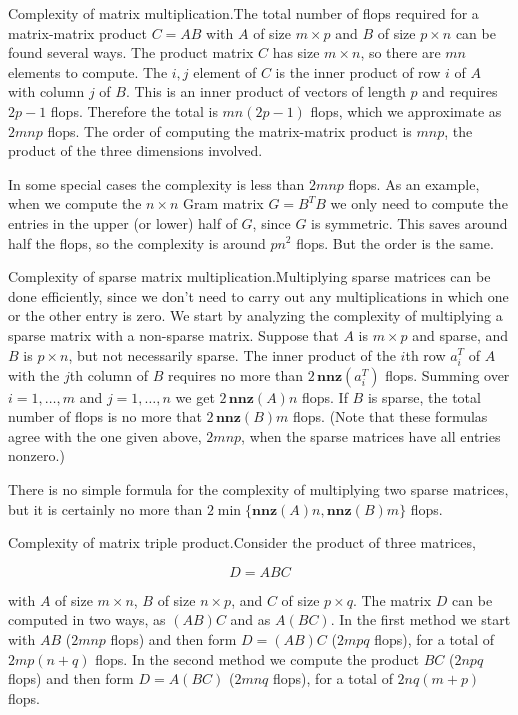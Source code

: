 
Complexity of matrix multiplication.The total number of flops required for a matrix-matrix product \(C=AB\) with \(A\) of size \(m\times p\) and \(B\) of size \(p\times n\) can be found several ways. The product matrix \(C\) has size \(m\times n\), so there are \(mn\) elements to compute. The \(i,j\) element of \(C\) is the inner product of row \(i\) of \(A\) with column \(j\) of \(B\). This is an inner product of vectors of length \(p\) and requires \(2p-1\) flops. Therefore the total is \(mn(2p-1)\) flops, which we approximate as \(2mnp\) flops. The order of computing the matrix-matrix product is \(mnp\), the product of the three dimensions involved.

In some special cases the complexity is less than \(2mnp\) flops. As an example, when we compute the \(n\times n\) Gram matrix \(G=B^{T}B\) we only need to compute the entries in the upper (or lower) half of \(G\), since \(G\) is symmetric. This saves around half the flops, so the complexity is around \(pn^{2}\) flops. But the order is the same.

Complexity of sparse matrix multiplication.Multiplying sparse matrices can be done efficiently, since we don't need to carry out any multiplications in which one or the other entry is zero. We start by analyzing the complexity of multiplying a sparse matrix with a non-sparse matrix. Suppose that \(A\) is \(m\times p\) and sparse, and \(B\) is \(p\times n\), but not necessarily sparse. The inner product of the \(i\)th row \(a_{i}^{T}\) of \(A\) with the \(j\)th column of \(B\) requires no more than \(2\,\mathbf{nnz}(a_{i}^{T})\) flops. Summing over \(i=1,\ldots,m\) and \(j=1,\ldots,n\) we get \(2\,\mathbf{nnz}(A)n\) flops. If \(B\) is sparse, the total number of flops is no more that \(2\,\mathbf{nnz}(B)m\) flops. (Note that these formulas agree with the one given above, \(2mnp\), when the sparse matrices have all entries nonzero.)

There is no simple formula for the complexity of multiplying two sparse matrices, but it is certainly no more than \(2\min\{\mathbf{nnz}(A)n,\mathbf{nnz}(B)m\}\) flops.

Complexity of matrix triple product.Consider the product of three matrices,

\[D=ABC\]

with \(A\) of size \(m\times n\), \(B\) of size \(n\times p\), and \(C\) of size \(p\times q\). The matrix \(D\) can be computed in two ways, as \((AB)C\) and as \(A(BC)\). In the first method we start with \(AB\) (\(2mnp\) flops) and then form \(D=(AB)C\) (\(2mpq\) flops), for a total of \(2mp(n+q)\) flops. In the second method we compute the product \(BC\) (\(2npq\) flops) and then form \(D=A(BC)\) (\(2mnq\) flops), for a total of \(2nq(m+p)\) flops.

